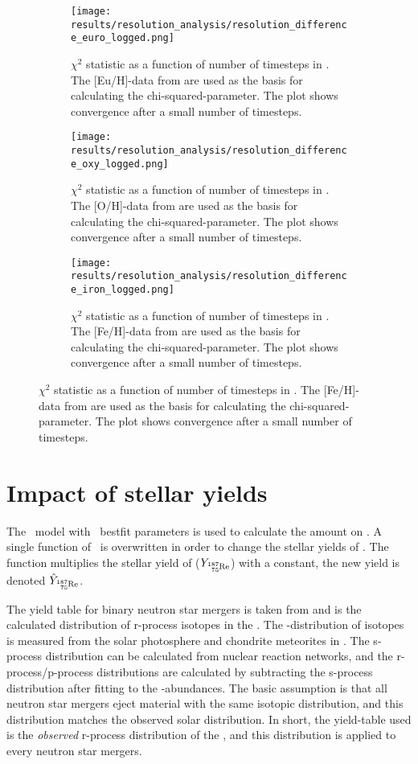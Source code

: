 \setlength{\subfigwidth}{0.3\textwidth}
\begin{figure}
  \centering
  \begin{subfigure}{\subfigwidth}
    \texttt{[image: results/resolution\_analysis/resolution\_difference\_euro\_logged.png]}
    \caption[\todo]{
      \label{fig:fit-res-euro}
      $\chi^2$ statistic as a function of number of timesteps in \omegamodel.
      The [Eu/H]-data from \eris are used as the basis for calculating the chi-squared-parameter.
      The plot shows convergence after a small number of timesteps.
    }
  \end{subfigure}
  \hfill
  \begin{subfigure}{\subfigwidth}
    \texttt{[image: results/resolution\_analysis/resolution\_difference\_oxy\_logged.png]}
    \caption[\todo]{
      \label{fig:fit-res-oxy}
      $\chi^2$ statistic as a function of number of timesteps in \omegamodel.
      The [O/H]-data from \eris are used as the basis for calculating the chi-squared-parameter.
      The plot shows convergence after a small number of timesteps.
    }
  \end{subfigure}
  \hfill
  \begin{subfigure}{\subfigwidth}
    \texttt{[image: results/resolution\_analysis/resolution\_difference\_iron\_logged.png]}
    \caption[\todo]{
      \label{fig:fit-res-iron}
      $\chi^2$ statistic as a function of number of timesteps in \omegamodel.
      The [Fe/H]-data from \eris are used as the basis for calculating the chi-squared-parameter.
      The plot shows convergence after a small number of timesteps.
    }
  \end{subfigure}
\end{figure}

\FloatBarrier

\section{Impact of stellar yields} \label{sec:methods-yields}
The \omegamodel\ model with \eris\ bestfit parameters is used to calculate the amount on .
A single function of \omegamodel\ is overwritten in order to change the stellar yields of .
The function multiplies the stellar yield of  ($Y_\re{187}$) with a constant, the new yield is denoted $\hat{Y}_\re{187}$.

The yield table for binary neutron star mergers is taken from \cite{arnould07} and is the calculated distribution of r-process isotopes in the \sos.
The \sos-distribution of isotopes is measured from the solar photosphere and chondrite meteorites in \cite{landolt93}.
The s-process distribution can be calculated from nuclear reaction networks, and the r-process/p-process distributions are calculated by subtracting the s-process distribution after fitting to the \sos-abundances.
The basic assumption is that all neutron star mergers eject material with the same isotopic distribution, and this distribution matches the observed solar distribution.
In short, the yield-table used is the \textit{observed} r-process distribution of the \sos, and this distribution is applied to every neutron star mergers.

